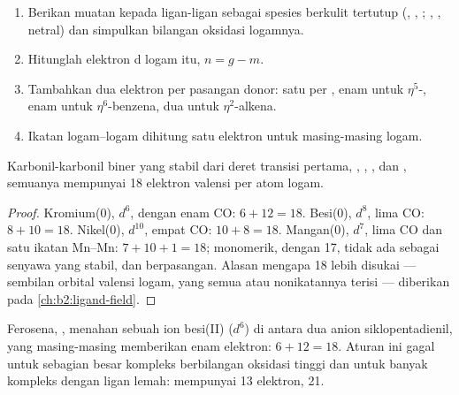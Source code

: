 \begin{method}\label{met:b2:coordination-complexes:electron-count}
\begin{enumerate}
  \item Berikan muatan kepada ligan-ligan sebagai spesies berkulit tertutup
        (, , ; , ,  netral) dan
        simpulkan bilangan oksidasi logamnya.
  \item Hitunglah elektron d logam itu, $n = g - m$.
  \item Tambahkan dua elektron per pasangan donor: satu per ,
        enam untuk $\eta^5$-, enam untuk $\eta^6$-benzena, dua untuk
        $\eta^2$-alkena.
  \item Ikatan logam--logam dihitung satu elektron untuk masing-masing logam.
\end{enumerate}
\end{method}

\begin{proposition}\label{prop:b2:coordination-complexes:eighteen}
Karbonil-karbonil biner yang stabil dari deret transisi pertama, ,
, , dan , semuanya mempunyai 18 elektron
valensi per atom logam.
\end{proposition}

\begin{proof}
Kromium(0), $d^6$, dengan enam CO: $6 + 12 = 18$. Besi(0), $d^8$, lima CO: $8 + 10 = 18$.
Nikel(0), $d^{10}$, empat CO: $10 + 8 = 18$. Mangan(0), $d^7$, lima CO dan
satu ikatan Mn--Mn: $7 + 10 + 1 = 18$;  monomerik, dengan 17,
tidak ada sebagai senyawa yang stabil, dan berpasangan. Alasan mengapa 18
lebih disukai --- sembilan orbital valensi logam, yang semua 
atau nonikatannya terisi --- diberikan pada \cref{ch:b2:ligand-field}.
\end{proof}

Ferosena, , menahan sebuah ion besi(II) ($d^6$) di antara
dua anion siklopentadienil, yang masing-masing memberikan enam elektron:
$6 + 12 = 18$. Aturan ini gagal untuk sebagian besar kompleks berbilangan
oksidasi tinggi dan untuk banyak kompleks dengan ligan lemah:
 mempunyai 13 elektron,  21.

